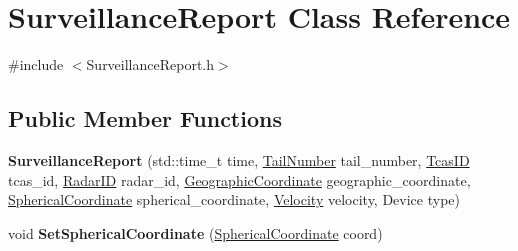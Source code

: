 \hypertarget{class_surveillance_report}{}\section{Surveillance\+Report Class Reference}
\label{class_surveillance_report}


{\ttfamily \#include $<$Surveillance\+Report.\+h$>$}

\subsection*{Public Member Functions}
\begin{DoxyCompactItemize}
\item 
\hypertarget{class_surveillance_report_ad4fedb37f5c16d694fcb7bd0a0ade001}{}{\bfseries Surveillance\+Report} (std\+::time\+\_\+t time, \hyperlink{class_tail_number}{Tail\+Number} tail\+\_\+number, \hyperlink{class_tcas_i_d}{Tcas\+I\+D} tcas\+\_\+id, \hyperlink{class_radar_i_d}{Radar\+I\+D} radar\+\_\+id, \hyperlink{class_geographic_coordinate}{Geographic\+Coordinate} geographic\+\_\+coordinate, \hyperlink{class_spherical_coordinate}{Spherical\+Coordinate} spherical\+\_\+coordinate, \hyperlink{class_velocity}{Velocity} velocity, Device type)\label{class_surveillance_report_ad4fedb37f5c16d694fcb7bd0a0ade001}

\item 
\hypertarget{class_surveillance_report_a8f1ee43d216bdcc0b23522ac1c1f1271}{}void {\bfseries Set\+Spherical\+Coordinate} (\hyperlink{class_spherical_coordinate}{Spherical\+Coordinate} coord)\label{class_surveillance_report_a8f1ee43d216bdcc0b23522ac1c1f1271}


\end{DoxyCompactItemize}
